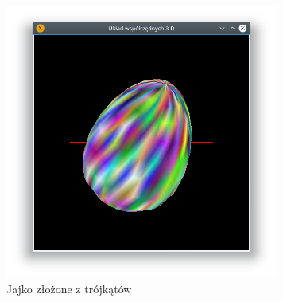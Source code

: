 \documentclass[12pt,a4paper,titlepage]{article}
\begin{document}
\begin{figure}[H]
\centering
\includegraphics[width = 9cm]{images/egg_triangles.png}
\caption{Jajko złożone z trójkątów}
\label{fig:eggTriangles}
\end{figure}
\end{document}
